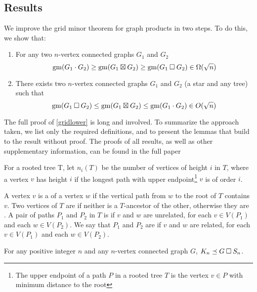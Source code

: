 \documentclass[../main.tex]{subfiles}
\begin{document}
	\subsection{Results}
	We improve the grid minor theorem for graph products in two steps. To do this, we show that:
	\begin{enumerate}
		\item  For any two $n$-vertex connected graphs $G_1$ and $G_2$
		\begin{equation} \label{gridlower}
			\operatorname{gm}(G_1\cdot G_2) \geq \operatorname{gm}(G_1\boxtimes G_2) \geq \operatorname{gm}(G_1\mathbin{\Box} G_2) \in \Omega(\sqrt{n})
		\end{equation} 
		
		\item There exists two $n$-vertex connected graphs $G_1$ and $G_2$ (a star and any tree) such that   
		\begin{equation} \label{gridupper}
			\operatorname{gm}(G_1\mathbin{\Box} G_2) \leq \operatorname{gm}(G_1\boxtimes G_2) \leq \operatorname{gm}(G_1\cdot G_2) \in O(\sqrt{n}) 
		\end{equation} 
	\end{enumerate}
	
		The full proof of \cref{gridlower} is long and involved. To summarize the approach taken, we list only the required definitions, and to present the lemmas that build to the result without proof. The proofs of all results, as well as other supplementary information, can be found in the full paper \cite{DMWW24}
	
	For a rooted tree T, let $n_i(T)$ be the number of vertices of height $i$ in $T$, where a vertex $v$ has height $i$ if the longest path with upper endpoint\footnote{The upper endpoint of a path $P$ in a rooted tree $T$ is the vertex $v\in P$ with minimum distance to the root} $v$ is of order $i$.
	
	A vertex $v$ is a  of a vertex $w$ if the vertical path from $w$ to the root of $T$ contains $v$.  Two vertices of $T$ are  if neither is a $T$-ancestor of the other, otherwise they are .  A pair of paths $P_1$ and $P_2$ in $T$ is  if $v$ and $w$ are unrelated, for each $v\in V(P_1)$ and each $w\in V(P_2)$.  We say that $P_1$ and $P_2$ are  if $v$ and $w$ are related, for each $v\in V(P_1)$ and each $w\in V(P_2)$.
	
	\begin{lem}\label{anything_times_star}
		For any positive integer $n$ and any $n$-vertex connected graph $G$, $K_{n} \preceq G\mathbin{\Box} S_n$.
	\end{lem}
	
\end{document}
